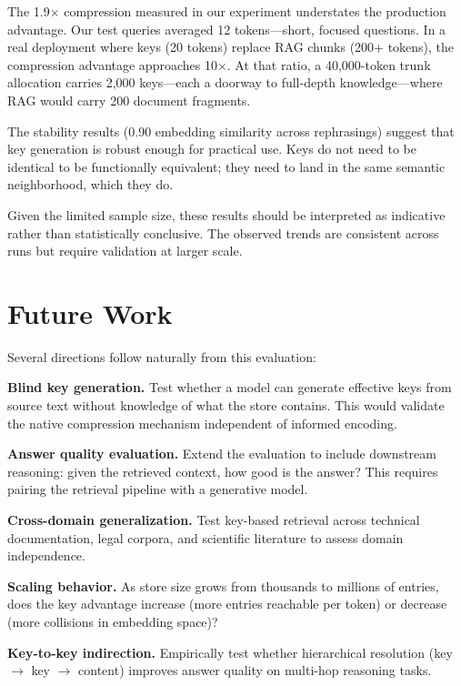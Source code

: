 \documentclass{article}
\begin{document}
The 1.9$\times$ compression measured in our experiment understates the production advantage. Our test queries averaged 12 tokens---short, focused questions. In a real deployment where keys (20 tokens) replace RAG chunks (200+ tokens), the compression advantage approaches 10$\times$. At that ratio, a 40,000-token trunk allocation carries 2,000 keys---each a doorway to full-depth knowledge---where RAG would carry 200 document fragments.

The stability results (0.90 embedding similarity across rephrasings) suggest that key generation is robust enough for practical use. Keys do not need to be identical to be functionally equivalent; they need to land in the same semantic neighborhood, which they do.

Given the limited sample size, these results should be interpreted as indicative rather than statistically conclusive. The observed trends are consistent across runs but require validation at larger scale.
\section{Future Work}
\label{sec:future}

Several directions follow naturally from this evaluation:

\textbf{Blind key generation.} Test whether a model can generate effective keys from source text without knowledge of what the store contains. This would validate the native compression mechanism independent of informed encoding.

\textbf{Answer quality evaluation.} Extend the evaluation to include downstream reasoning: given the retrieved context, how good is the answer? This requires pairing the retrieval pipeline with a generative model.

\textbf{Cross-domain generalization.} Test key-based retrieval across technical documentation, legal corpora, and scientific literature to assess domain independence.

\textbf{Scaling behavior.} As store size grows from thousands to millions of entries, does the key advantage increase (more entries reachable per token) or decrease (more collisions in embedding space)?

\textbf{Key-to-key indirection.} Empirically test whether hierarchical resolution (key $\rightarrow$ key $\rightarrow$ content) improves answer quality on multi-hop reasoning tasks.
\end{document}
